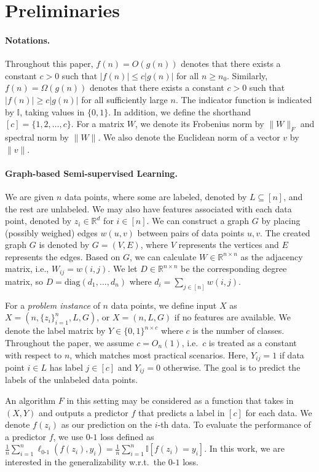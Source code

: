 \section{Preliminaries}

\paragraph{Notations.}
Throughout this paper, $f(n) = O(g(n))$ denotes that there exists a constant $c > 0$ such that $|f(n)| \leq c|g(n)|$ for all $n\ge n_0$. Similarly, $f(n) = \Omega(g(n))$ denotes that there exists a constant $c > 0$ such that $|f(n)| \geq c|g(n)|$ for all sufficiently large $n$. The indicator function is indicated by $\mathbb{I}$, taking values in $\{0, 1\}$.
In addition, we define the shorthand $[c] = \{1, 2, \ldots, c\}$. For a matrix $W$, we denote its Frobenius norm by $\|W\|_F$ and spectral norm by $\|W\|$. We also denote the Euclidean norm of a vector $v$ by $\|v\|$. 

\paragraph{Graph-based Semi-supervised Learning.}
We are given $n$ data points, where some are labeled, denoted by $L \subseteq [n]$, and the rest are unlabeled. We may also have features associated with each data point, denoted by $z_i \in \mathbb{R}^d$ for $i \in [n]$. We can construct a graph $G$ by placing (possibly weighed) edges $w(u,v)$ between pairs of data points $u,v$. The created graph $G$ is denoted by $G = (V, E)$, where $V$ represents the vertices and $E$ represents the edges. Based on $G$, we can calculate $W \in \mathbb{R}^{n \times n}$ as the adjacency matrix, i.e., $W_{ij} = w(i,j)$.
We let $D \in \mathbb{R}^{n \times n}$ be the corresponding degree matrix, so $D = \text{diag}(d_1, \ldots, d_n)$ where $d_i = \sum_{j \in [n]} w(i,j)$.

For a {\it problem instance} of $n$ data points, we define input $X$ as $X=(n, \{z_i\}_{i=1}^n, L, G)$, or $X=(n, L, G)$ if no features are available. We denote the label matrix by $Y \in \{0,1\}^{n \times c}$ where $c$ is the number of classes. Throughout the paper, we assume $c = O_n(1)$, i.e.\ $c$ is treated as a constant with respect to $n$, which matches most practical scenarios.
Here, $Y_{ij} = 1$ if data point $i \in L$ has label $j \in [c]$ and $Y_{ij} = 0$ otherwise. The goal is to predict the labels of the unlabeled data points. 

An algorithm $F$ in this setting may be considered as a function that takes in $(X, Y)$ and outputs a predictor $f$ that predicts a label in $[c]$ for each data.
We denote $f(z_i)$ as our prediction on the $i$-th data.
To evaluate the performance of a predictor $f$, we use $0$-$1$ loss %
defined as $\frac{1}{n}\sum_{i=1}^n \ell_{0\text{-}1}\left(f(z_i),y_i\right) = \frac{1}{n}\sum_{i=1}^n \mathbb{I}[f(z_i) = y_i].$ In this work, we are interested in the generalizability %
w.r.t.\ the $0$-$1$ loss. 

